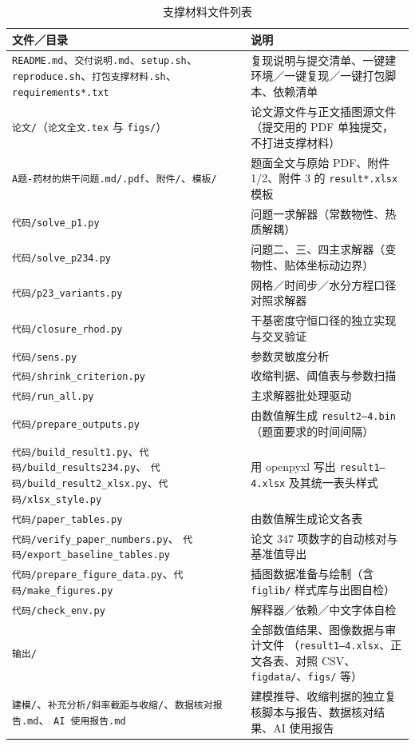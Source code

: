 \documentclass[12pt,a4paper,fontset=none]{ctexart}
\begin{document}
\begin{table}[htbp]
  \centering
  \caption{支撑材料文件列表}
  \label{tab:support-files}
  \small
  \begin{tabular}{@{}>{\raggedright\arraybackslash}p{6.6cm}>{\raggedright\arraybackslash}p{7.4cm}@{}}
    \toprule
    文件／目录 & 说明 \\
    \midrule
    \texttt{README.md}、\texttt{交付说明.md}、\texttt{setup.sh}、
    \texttt{reproduce.sh}、\texttt{打包支撑材料.sh}、\texttt{requirements*.txt}
      & 复现说明与提交清单、一键建环境／一键复现／一键打包脚本、依赖清单 \\
    \texttt{论文/}（\texttt{论文全文.tex} 与 \texttt{figs/}）
      & 论文源文件与正文插图源文件（提交用的 PDF 单独提交，不打进支撑材料） \\
    \texttt{A题-药材的烘干问题.md/.pdf}、\texttt{附件/}、\texttt{模板/}
      & 题面全文与原始 PDF、附件 1/2、附件 3 的 \texttt{result*.xlsx} 模板 \\
    \texttt{代码/solve\_p1.py} & 问题一求解器（常数物性、热质解耦） \\
    \texttt{代码/solve\_p234.py}
      & 问题二、三、四主求解器（变物性、贴体坐标动边界） \\
    \texttt{代码/p23\_variants.py} & 网格／时间步／水分方程口径对照求解器 \\
    \texttt{代码/closure\_rhod.py} & 干基密度守恒口径的独立实现与交叉验证 \\
    \texttt{代码/sens.py} & 参数灵敏度分析 \\
    \texttt{代码/shrink\_criterion.py} & 收缩判据、阈值表与参数扫描 \\
    \texttt{代码/run\_all.py} & 主求解器批处理驱动 \\
    \texttt{代码/prepare\_outputs.py}
      & 由数值解生成 \texttt{result2--4.bin}（题面要求的时间间隔） \\
    \texttt{代码/build\_result1.py}、\texttt{代码/build\_results234.py}、
    \texttt{代码/build\_result2\_xlsx.py}、\texttt{代码/xlsx\_style.py}
      & 用 openpyxl 写出 \texttt{result1--4.xlsx} 及其统一表头样式 \\
    \texttt{代码/paper\_tables.py} & 由数值解生成论文各表 \\
    \texttt{代码/verify\_paper\_numbers.py}、
    \texttt{代码/export\_baseline\_tables.py}
      & 论文 347 项数字的自动核对与基准值导出 \\
    \texttt{代码/prepare\_figure\_data.py}、\texttt{代码/make\_figures.py}
      & 插图数据准备与绘制（含 \texttt{figlib/} 样式库与出图自检） \\
    \texttt{代码/check\_env.py} & 解释器／依赖／中文字体自检 \\
    \texttt{输出/} & 全部数值结果、图像数据与审计文件
      （\texttt{result1--4.xlsx}、正文各表、对照 CSV、
      \texttt{figdata/}、\texttt{figs/} 等） \\
    \texttt{建模/}、\texttt{补充分析/斜率截距与收缩/}、\texttt{数据核对报告.md}、
    \texttt{AI 使用报告.md}
      & 建模推导、收缩判据的独立复核脚本与报告、数据核对结果、AI 使用报告 \\
    \bottomrule
  \end{tabular}
\end{table}
\end{document}
